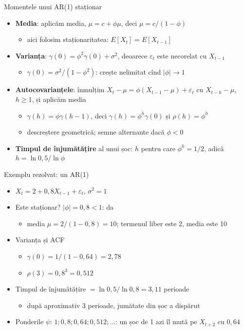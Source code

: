 \begin{frame}{Momentele unui AR(1) staționar}
\itemsize{\small}
\begin{itemize}
    \item \textbf{Media}: aplicăm media, $\mu = c + \phi\mu$, deci $\mu = c/(1 - \phi)$
    \begin{itemize}
        \item aici folosim staționaritatea: $E[X_t] = E[X_{t-1}]$
    \end{itemize}
    \item \textbf{Varianța}: $\gamma(0) = \phi^2\gamma(0) + \sigma^2$, deoarece $\varepsilon_t$ este necorelat cu $X_{t-1}$
    \begin{itemize}
        \item $\gamma(0) = \sigma^2/(1 - \phi^2)$: crește nelimitat cînd $|\phi| \to 1$
    \end{itemize}
    \item \textbf{Autocovarianțele}: înmulțim $X_t - \mu = \phi(X_{t-1} - \mu) + \varepsilon_t$ cu $X_{t-h} - \mu$, $h \ge 1$, și aplicăm media
    \begin{itemize}
        \item $\gamma(h) = \phi\gamma(h - 1)$, deci $\gamma(h) = \phi^h\gamma(0)$ și $\rho(h) = \phi^h$
        \item descreștere geometrică; semne alternante dacă $\phi < 0$
    \end{itemize}
    \item \textbf{Timpul de înjumătățire} al unui șoc: $h$ pentru care $\phi^h = 1/2$, adică $h = \ln 0{,}5/\ln\phi$
\end{itemize}
\end{frame}

\begin{frame}{Exemplu rezolvat: un AR(1)}
\itemsize{\small}
\begin{itemize}
    \item $X_t = 2 + 0{,}8X_{t-1} + \varepsilon_t$, $\sigma^2 = 1$
    \item Este staționar? $|\phi| = 0{,}8 < 1$: da
    \begin{itemize}
        \item media $\mu = 2/(1 - 0{,}8) = 10$; termenul liber este 2, media este 10
    \end{itemize}
    \item Varianța și ACF
    \begin{itemize}
        \item $\gamma(0) = 1/(1 - 0{,}64) = 2{,}78$
        \item $\rho(3) = 0{,}8^3 = 0{,}512$
    \end{itemize}
    \item Timpul de înjumătățire $= \ln 0{,}5/\ln 0{,}8 = 3{,}11$ perioade
    \begin{itemize}
        \item după aproximativ 3 perioade, jumătate din șoc a dispărut
    \end{itemize}
    \item Ponderile $\psi$: $1; 0{,}8; 0{,}64; 0{,}512; \dots$: un șoc de 1 azi îl mută pe $X_{t+2}$ cu $0{,}64$
\end{itemize}
\end{frame}

